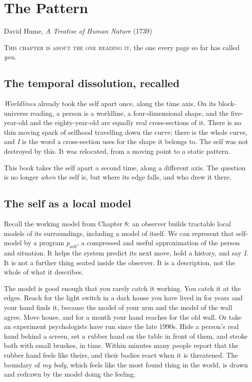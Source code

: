 \chapter{The Pattern}

{David Hume, \textit{A Treatise of Human Nature} (1739)}

\noindent \textsc{This chapter is about the one reading it}, the one every page so far has called \emph{you}.

\section*{The temporal dissolution, recalled}

\textit{Worldlines} already took the self apart once, along the time axis. On its block-universe reading, a person is a worldline, a four-dimensional shape, and the five-year-old and the eighty-year-old are equally real cross-sections of it. There is no thin moving spark of selfhood travelling down the curve; there is the whole curve, and \emph{I} is the word a cross-section uses for the shape it belongs to. The self was not destroyed by this. It was relocated, from a moving point to a static pattern.

This book takes the self apart a second time, along a different axis. The question is no longer \emph{when} the self is, but where its edge falls, and who drew it there.

\section*{The self as a local model}

Recall the working model from Chapter 8: an observer builds tractable local models of its surroundings, including a model of itself. We can represent that self-model by a program $p_{\text{self}}$, a compressed and useful approximation of the person and situation. It helps the system predict its next move, hold a history, and say \emph{I}. It is not a further thing seated inside the observer. It is a description, not the whole of what it describes.

The model is good enough that you rarely catch it working. You catch it at the edges. Reach for the light switch in a dark house you have lived in for years and your hand finds it, because the model of your arm and the model of the wall agree. Move house, and for a month your hand reaches for the old wall. Or take an experiment psychologists have run since the late 1990s. Hide a person's real hand behind a screen, set a rubber hand on the table in front of them, and stroke both with small brushes, in time. Within minutes many people report that the rubber hand feels like theirs, and their bodies react when it is threatened. The boundary of \emph{my body}, which feels like the most found thing in the world, is drawn and redrawn by the model doing the feeling.


